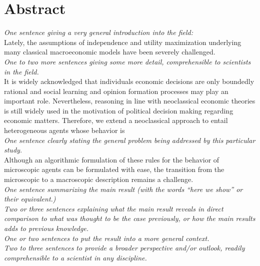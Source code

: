 \section{Abstract}

\emph{One sentence giving a very general introduction into the field:} \\

Lately, the assumptions of independence and utility maximization underlying many classical macroeconomic models have been severely challenged.  \\


\emph{One to two more sentences giving some more detail, comprehensible to scientists in the field.} \\
It is widely acknowledged that individuals economic decisions are only boundedly rational and social learning and opinion formation processes may play an important role. Nevertheless, reasoning in line with neoclassical economic theories is still widely used in the motivation of political decision making regarding economic matters. Therefore, we extend a neoclassical approach to entail heterogeneous agents whose behavior is  \\ 

\emph{One sentence clearly stating the general problem being addressed by this particular study.} \\
Although an algorithmic formulation of these rules for the behavior of microscopic agents can be formulated with ease, the transition from the microscopic to a macroscopic description remains a challenge. \\

\emph{One sentence summarizing the main result (with the words ``here we show'' or their equivalent.)} \\

\emph{Two or three sentences explaining what the main result reveals in direct comparison to what was thought to be the case previously, or how the main results adds to previous knowledge.} \\

\emph{One or two sentences to put the result into a more general context.} \\

\emph{Two to three sentences to provide a broader perspective and/or outlook, readily comprehensible to a scientist in any discipline.}
